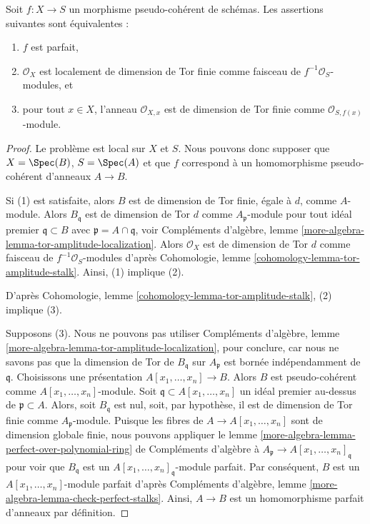 \begin{lemma}
\label{lemma-check-perfect-stalks}
Soit $f : X \to S$ un morphisme pseudo-cohérent de schémas.
Les assertions suivantes sont équivalentes :
\begin{enumerate}
\item $f$ est parfait,
\item $\mathcal{O}_X$ est localement de dimension de Tor finie comme
faisceau de $f^{-1}\mathcal{O}_S$-modules, et
\item pour tout $x \in X$, l'anneau $\mathcal{O}_{X, x}$ est de dimension de Tor
finie comme $\mathcal{O}_{S, f(x)}$-module.
\end{enumerate}
\end{lemma}

\begin{proof}
Le problème est local sur $X$ et $S$. Nous pouvons donc supposer que
$X = \Spec(B)$, $S = \Spec(A)$ et que $f$ correspond à un homomorphisme pseudo-cohérent
d'anneaux $A \to B$.

\medskip\noindent
Si (1) est satisfaite, alors $B$ est de dimension de Tor finie, égale à $d$, comme $A$-module. Alors
$B_\mathfrak q$ est de dimension de Tor $d$ comme $A_\mathfrak p$-module pour tout
idéal premier $\mathfrak q \subset B$ avec $\mathfrak p = A \cap \mathfrak q$, voir
Compléments d'algèbre, lemme \ref{more-algebra-lemma-tor-amplitude-localization}.
Alors $\mathcal{O}_X$ est de dimension de Tor $d$ comme
faisceau de $f^{-1}\mathcal{O}_S$-modules d'après
Cohomologie, lemme \ref{cohomology-lemma-tor-amplitude-stalk}.
Ainsi, (1) implique (2).

\medskip\noindent
D'après Cohomologie, lemme \ref{cohomology-lemma-tor-amplitude-stalk}, (2) implique
(3).

\medskip\noindent
Supposons (3). Nous ne pouvons pas utiliser
Compléments d'algèbre, lemme \ref{more-algebra-lemma-tor-amplitude-localization},
pour conclure, car nous ne savons pas que la dimension de Tor de
$B_\mathfrak q$ sur $A_\mathfrak p$ est bornée indépendamment de $\mathfrak q$.
Choisissons une présentation $A[x_1, \ldots, x_n] \to B$. Alors $B$ est
pseudo-cohérent comme $A[x_1, \ldots, x_n]$-module. Soit
$\mathfrak q \subset A[x_1, \ldots, x_n]$ un idéal premier
au-dessus de $\mathfrak p \subset A$. Alors, soit $B_\mathfrak q$ est nul,
soit, par hypothèse, il est de dimension de Tor finie comme
$A_\mathfrak p$-module. Puisque les fibres de $A \to A[x_1, \ldots, x_n]$
sont de dimension globale finie, nous pouvons appliquer le
lemme \ref{more-algebra-lemma-perfect-over-polynomial-ring} de Compléments d'algèbre
à $A_\mathfrak p \to A[x_1, \ldots, x_n]_\mathfrak q$
pour voir que $B_\mathfrak q$ est un
$A[x_1, \ldots, x_n]_\mathfrak q$-module parfait. Par conséquent,
$B$ est un $A[x_1, \ldots, x_n]$-module parfait d'après
Compléments d'algèbre, lemme \ref{more-algebra-lemma-check-perfect-stalks}.
Ainsi, $A \to B$ est un homomorphisme parfait d'anneaux par définition.
\end{proof}

